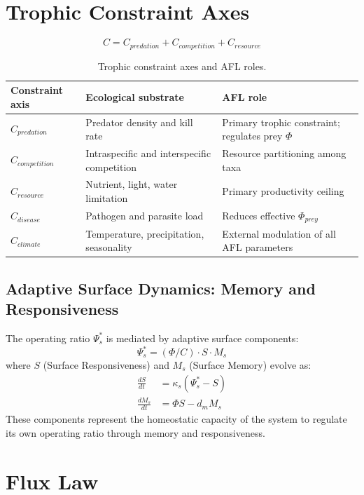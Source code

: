 \documentclass[11pt]{article}
\begin{document}
\section{Trophic Constraint Axes}

\begin{equation}
C = C_{predation} + C_{competition} + C_{resource}
\end{equation}

\begin{table}[h]
\centering
\caption{Trophic constraint axes and AFL roles.}
\begin{tabularx}{\textwidth}{@{}lXX@{}}
\toprule
Constraint axis & Ecological substrate & AFL role \\
\midrule
$C_{predation}$ & Predator density and kill rate & Primary trophic constraint; regulates prey $\Phi$ \\
$C_{competition}$ & Intraspecific and interspecific competition & Resource partitioning among taxa \\
$C_{resource}$ & Nutrient, light, water limitation & Primary productivity ceiling \\
$C_{disease}$ & Pathogen and parasite load & Reduces effective $\Phi_{prey}$ \\
$C_{climate}$ & Temperature, precipitation, seasonality & External modulation of all AFL parameters \\
\bottomrule
\end{tabularx}
\end{table}

\subsection{Adaptive Surface Dynamics: Memory and Responsiveness}

The operating ratio $\Psi_s^*$ is mediated by adaptive surface components:
\begin{equation}
\Psi_s^* = (\Phi/C) \cdot S \cdot M_s
\end{equation}
where $S$ (Surface Responsiveness) and $M_s$ (Surface Memory) evolve as:
\begin{align}
\frac{dS}{dt} &= \kappa_s (\Psi_s^* - S) \\
\frac{dM_s}{dt} &= \Phi S - d_m M_s
\end{align}
These components represent the homeostatic capacity of the system to regulate its own operating ratio through memory and responsiveness.

\section{Flux Law}
\end{document}
